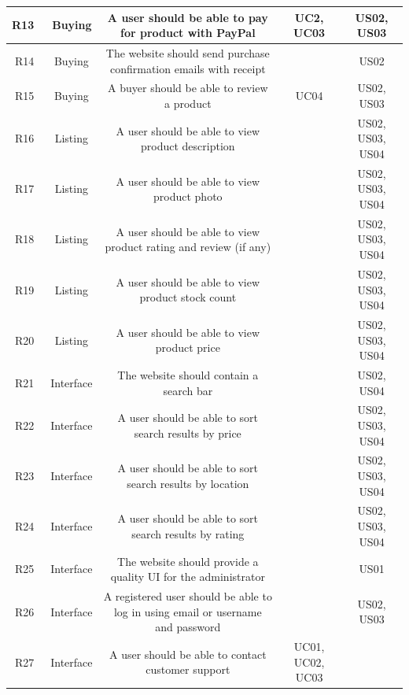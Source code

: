 \documentclass[11pt]{article}
\newcounter{use case ID}
\begin{document}
\begin{table}[H]
\begin{adjustbox}{width=\columnwidth,center}
\begin{tabular}{|r | c| c | c| c|}
                R13 & \ Buying & A user should be able to pay for product with PayPal & UC2, UC03 & US02, US03 \\
                \hline
                R14 & \ Buying & The website should send purchase confirmation emails with receipt & & US02 \\ 
                \hline
                R15 & \ Buying & A buyer should be able to review a product & UC04 & US02, US03 \\ 
                \hline
                R16 & \ Listing & A user should be able to view product description & & US02, US03, US04 \\ 
                \hline
                R17 & \ Listing & A user should be able to view product photo & & US02, US03, US04 \\ 
                \hline
                R18 & \ Listing & A user should be able to view product rating and review (if any) & & US02, US03, US04 \\
                \hline
                R19 & \ Listing & A user should be able to view product stock count & & US02, US03, US04 \\ 
                \hline
                R20 & \ Listing & A user should be able to view product price & & US02, US03, US04 \\ 
                    \hline
                R21 & \ Interface & The website should contain a search bar & & US02, US04 \\
                \hline
                R22 & \ Interface & A user should be able to sort search results by price  & & US02, US03, US04 \\ 
                \hline
                R23 & \ Interface & A user should be able to sort search results by location  & & US02, US03, US04 \\ 
                \hline
                R24 & \ Interface & A user should be able to sort search results by rating  & & US02, US03, US04 \\ 
                \hline
                R25 & \ Interface & The website should provide a quality UI for the administrator & & US01 \\ 
                \hline
                R26 & \ Interface & A registered user should be able to log in using email or username and password & & US02, US03 \\
                    \hline
                R27 & \ Interface & A user should be able to contact customer support & UC01, UC02, UC03 &  \\

\end{tabular}
\end{adjustbox}
\end{table}
\end{document}
